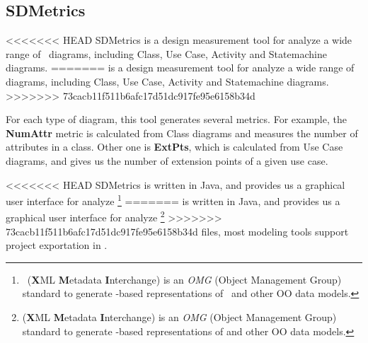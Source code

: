 \subsection{SDMetrics}
<<<<<<< HEAD
SDMetrics is a design measurement tool for analyze a wide range of \uml\ diagrams, including Class, Use Case, Activity and Statemachine diagrams.
=======
\sdmetricsS is a design measurement tool for analyze a wide range of \umlS diagrams, including Class, Use Case, Activity and Statemachine diagrams.
>>>>>>> 73cacb11f511b6afc17d51dc917fe95e6158b34d

For each type of diagram, this tool generates several metrics.
For example, the \textbf{NumAttr} metric is calculated from Class diagrams and measures the number of attributes in a class.
Other one is \textbf{ExtPts}, which is calculated from Use Case diagrams, and gives us the number of extension points of a given use case.

<<<<<<< HEAD
SDMetrics is written in \textsf{Java}, and provides us a graphical user interface for analyze \xmi\footnote{
\xmi\ (\textbf{X}ML \textbf{M}etadata \textbf{I}nterchange)  is an \textit{OMG} (Object Management Group) standard to generate \xml-based representations of \uml\ and other OO data models.} 
=======
\sdmetricsS is written in \textsf{Java}, and provides us a graphical user interface for analyze \xmi\footnote{
\xmi (\textbf{X}ML \textbf{M}etadata \textbf{I}nterchange)  is an \textit{OMG} (Object Management Group) standard to generate \xml -based representations of \umlS and other OO data models.} 
>>>>>>> 73cacb11f511b6afc17d51dc917fe95e6158b34d
files, most modeling tools support project exportation in \xmi.

